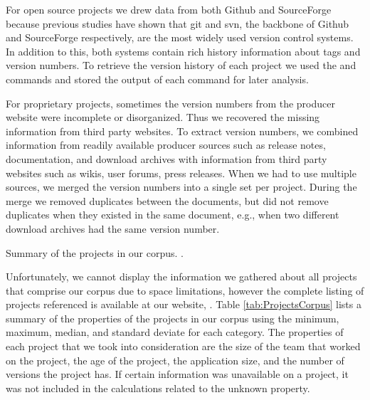 \documentclass[conference]{IEEEtran}
\begin{document}
For open source projects we drew data from both Github and SourceForge because previous studies \cite{brindescu2014} have shown that git and svn, the backbone of Github and SourceForge respectively, are the most widely used version control systems. In addition to this, both systems contain rich history information about tags and version numbers. To retrieve the version history of each project we used the  and  
commands and stored the output of each command for later analysis.

For proprietary projects, sometimes the version numbers from the producer website
were incomplete or disorganized. Thus we recovered the missing information from third party websites.
To extract version numbers, we combined information from readily available producer sources such as release notes, documentation, and download archives
with information from third party websites such as wikis, user forums, press releases.
When we had to use multiple sources, we merged the version numbers into a single set per project. During the merge we removed duplicates between the documents, but did not remove duplicates when they existed in the same document, e.g., when two different download archives had the same version number.

\begin{table*}[t]
\begin{adjustbox}{width=\textwidth}
\end{adjustbox}
\caption{Summary of the projects in our corpus. .}
\label{tab:ProjectsCorpus}
\end{table*}

Unfortunately, we cannot display the information we gathered about all \TotalNumProjects projects that comprise our corpus due to space limitations, however the complete listing of projects referenced is available at our website, \website.
Table \ref{tab:ProjectsCorpus} lists a summary of the properties of the projects in our corpus using the minimum, maximum, median, and standard deviate for each category. 
The properties of each project that we took into consideration are the size of the team that worked on the project, the age of the project, the application size, and the number of versions the project has. 
If certain information was unavailable on a project, it was not included in the calculations related to the unknown property.
\end{document}

